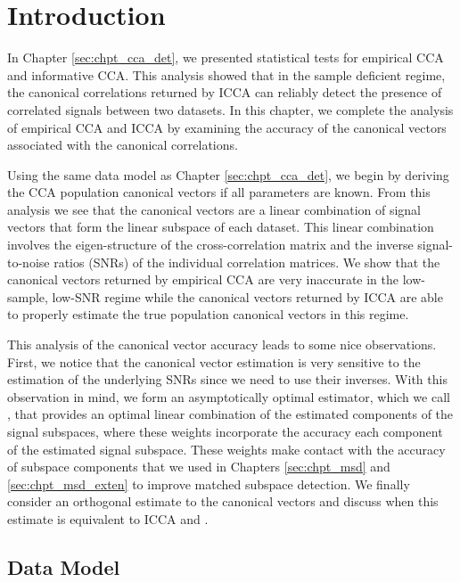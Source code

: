 \section{Introduction}

In Chapter \ref{sec:chpt_cca_det}, we presented statistical tests for empirical CCA and
informative CCA. This analysis showed that in the sample deficient regime, the canonical
correlations returned by ICCA can reliably detect the presence of correlated signals
between two datasets. In this chapter, we complete the analysis of empirical CCA and ICCA
by examining the accuracy of the canonical vectors associated with the canonical
correlations.

Using the same data model as Chapter \ref{sec:chpt_cca_det}, we begin by deriving the CCA
population canonical vectors if all parameters are known. From this analysis we see that
the canonical vectors are a linear combination of signal vectors that form the linear
subspace of each dataset. This linear combination involves the eigen-structure of the
cross-correlation matrix and the inverse signal-to-noise ratios (SNRs) of the individual
correlation matrices. We show that the canonical vectors returned by empirical CCA are
very inaccurate in the low-sample, low-SNR regime while the canonical vectors returned by
ICCA are able to properly estimate the true population canonical vectors in this regime.

This analysis of the canonical vector accuracy leads to some nice observations. First, we
notice that the canonical vector estimation is very sensitive to the estimation of the
underlying SNRs since we need to use their inverses. With this observation in mind, we
form an asymptotically optimal estimator, which we call \iccap, that provides an optimal
linear combination of the estimated components of the signal subspaces, where these
weights incorporate the accuracy each component of the estimated signal subspace. These
weights make contact with the accuracy of subspace components that we used in Chapters
\ref{sec:chpt_msd} and \ref{sec:chpt_msd_exten} to improve matched subspace detection. We
finally consider an orthogonal estimate to the canonical vectors and discuss when this
estimate is equivalent to ICCA and \iccap.

\subsection{Data Model}

